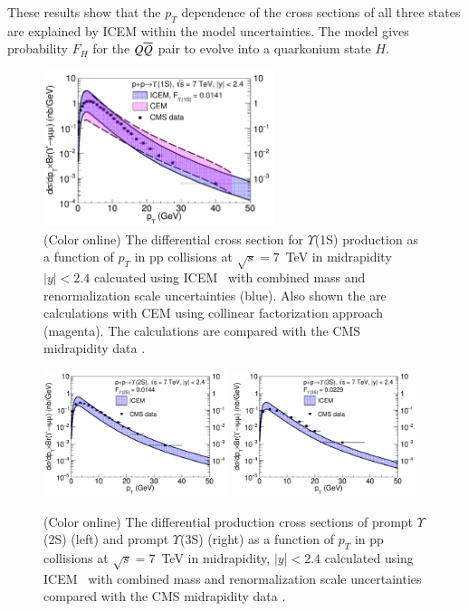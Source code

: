   These results show that the $p_T$ dependence of the cross sections of all three states
  are explained by ICEM within the model uncertainties. The model gives 
probability $F_H$ for the $Q \overline{Q}$ pair to evolve into a 
quarkonium state $H$.
  
\begin{figure}
\centering
\includegraphics[width=0.60\textwidth]{Figures/Fig1_RV1S.pdf}
\caption{(Color online) The differential cross section for $\varUpsilon$(1S) production as a function
  of $p_T$ in pp collisions at $\sqrt{s} = 7$~TeV in midrapidity $|y|<2.4$ calcuated using
ICEM~\cite{Cheung:2018upe} with combined mass and renormalization scale
uncertainties (blue).  Also shown the are calculations with CEM using collinear
factorization approach (magenta).
 The calculations are compared with the CMS midrapidity data \cite{Chatrchyan:2013yna}.}
\label{CMS_1S_pt}
\end{figure}



\begin{figure}
\centering
\includegraphics[width=0.48\textwidth]{Figures/Fig2l_RV2S.pdf}
\includegraphics[width=0.48\textwidth]{Figures/Fig2r_RV3S.pdf}
\caption{(Color online) The differential production cross sections of prompt $\varUpsilon$(2S) (left)
  and prompt $\varUpsilon$(3S) (right) as a function
  of $p_T$ in pp collisions at $\sqrt{s} = 7$~TeV in midrapidity, $|y|<2.4$
  calculated using ICEM~\cite{Cheung:2018upe} with combined mass and renormalization
  scale uncertainties compared with the CMS midrapidity data \cite{Chatrchyan:2013yna}.}
\label{CMS_2S_3S_pt}
\end{figure}








